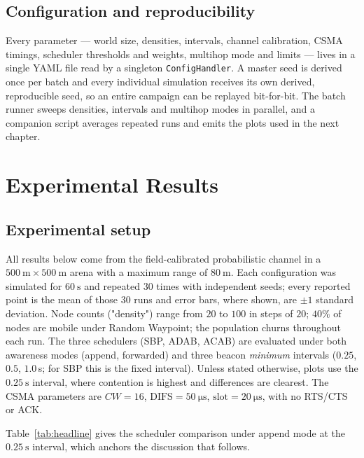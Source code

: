\documentclass[12pt,a4paper,oneside]{report}
\begin{document}
\section{Configuration and reproducibility}
Every parameter --- world size, densities, intervals, channel calibration, CSMA
timings, scheduler thresholds and weights, multihop mode and limits --- lives in
a single YAML file read by a singleton \texttt{ConfigHandler}. A master seed is
derived once per batch and every individual simulation receives its own derived,
reproducible seed, so an entire campaign can be replayed bit-for-bit. The batch
runner sweeps densities, intervals and multihop modes in parallel, and a
companion script averages repeated runs and emits the plots used in the next
chapter.

\chapter{Experimental Results}
\label{ch:results}

\section{Experimental setup}
All results below come from the field-calibrated probabilistic channel in a
$\SI{500}{\metre}\times\SI{500}{\metre}$ arena with a maximum range of
$\SI{80}{\metre}$. Each configuration was simulated for $\SI{60}{\second}$ and
repeated $30$ times with independent seeds; every reported point is the mean of
those $30$ runs and error bars, where shown, are $\pm1$ standard deviation. Node
counts ("density") range from $20$ to $100$ in steps of $20$; $40\%$ of nodes
are mobile under Random Waypoint; the population churns throughout each run. The
three schedulers (SBP, ADAB, ACAB) are evaluated under both awareness modes
(append, forwarded) and three beacon \emph{minimum} intervals
($0.25$, $0.5$, $1.0$\,s; for SBP this is the fixed interval). Unless stated
otherwise, plots use the $\SI{0.25}{\second}$ interval, where contention is
highest and differences are clearest. The CSMA parameters are
$CW=16$, $\text{DIFS}=\SI{50}{\micro\second}$,
$\text{slot}=\SI{20}{\micro\second}$, with no RTS/CTS or ACK.

Table~\ref{tab:headline} gives the scheduler comparison under append mode at the
$\SI{0.25}{\second}$ interval, which anchors the discussion that follows.
\end{document}
